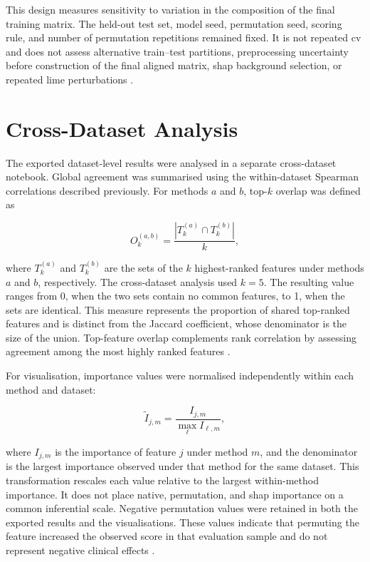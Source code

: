 This design measures sensitivity to variation in the composition of the final training matrix. The held-out test set, model seed, permutation seed, scoring rule, and number of permutation repetitions remained fixed. It is not repeated \gls{cv} and does not assess alternative train--test partitions, preprocessing uncertainty before construction of the final aligned matrix, \gls{shap} background selection, or repeated \gls{lime} perturbations \citep{lofstrom_meta_2022, canha_functionally-grounded_2025}.

\section{Cross-Dataset Analysis}

The exported dataset-level results were analysed in a separate cross-dataset notebook. Global agreement was summarised using the within-dataset Spearman correlations described previously. For methods $a$ and $b$, top-$k$ overlap was defined as

\begin{equation}
O_k^{(a,b)}
=
\frac{
\left|T_k^{(a)}\cap T_k^{(b)}\right|
}{k},
\end{equation}

where $T_k^{(a)}$ and $T_k^{(b)}$ are the sets of the $k$ highest-ranked features under methods $a$ and $b$, respectively. The cross-dataset analysis used $k=5$. The resulting value ranges from 0, when the two sets contain no common features, to 1, when the sets are identical. This measure represents the proportion of shared top-ranked features and is distinct from the Jaccard coefficient, whose denominator is the size of the union. Top-feature overlap complements rank correlation by assessing agreement among the most highly ranked features \citep{lofstrom_meta_2022, canha_functionally-grounded_2025}.

For visualisation, importance values were normalised independently within each method and dataset:

\begin{equation}
\widetilde{I}_{j,m}
=
\frac{I_{j,m}}
{\max_{\ell} I_{\ell,m}},
\end{equation}

where $I_{j,m}$ is the importance of feature $j$ under method $m$, and the denominator is the largest importance observed under that method for the same dataset. This transformation rescales each value relative to the largest within-method importance. It does not place native, permutation, and \gls{shap} importance on a common inferential scale. Negative permutation values were retained in both the exported results and the visualisations. These values indicate that permuting the feature increased the observed score in that evaluation sample and do not represent negative clinical effects \citep{fisher_models_2019}.

